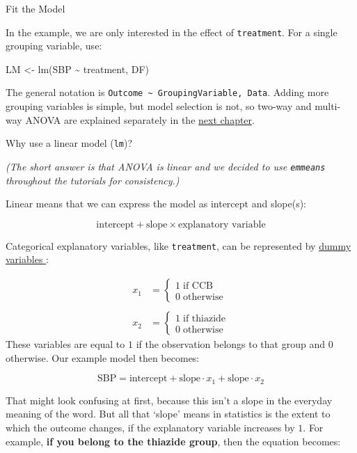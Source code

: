 \documentclass[
]{book}
\newenvironment{Shaded}{\begin{snugshade}}{\end{snugshade}}
\newcommand{\FunctionTok}[1]{\textcolor[rgb]{0.00,0.00,0.00}{#1}}
\newcommand{\NormalTok}[1]{#1}
\newcommand{\OtherTok}[1]{\textcolor[rgb]{0.56,0.35,0.01}{#1}}
\newcommand{\SpecialCharTok}[1]{\textcolor[rgb]{0.00,0.00,0.00}{#1}}
\begin{document}
Fit the Model

In the example, we are only interested in the effect of \texttt{treatment}. For a single grouping variable, use:

\begin{Shaded}
\begin{Highlighting}[]
\NormalTok{LM }\OtherTok{\textless{}{-}} \FunctionTok{lm}\NormalTok{(SBP }\SpecialCharTok{\textasciitilde{}}\NormalTok{ treatment, DF)}
\end{Highlighting}
\end{Shaded}

The general notation is \texttt{Outcome\ \textasciitilde{}\ GroupingVariable,\ Data}. Adding more grouping variables is simple, but model selection is not, so two-way and multi-way ANOVA are explained separately in the \protect\hyperlink{twowaymultiway}{next chapter}.

Why use a linear model (\texttt{lm})?

\emph{(The short answer is that ANOVA is linear and we decided to use \texttt{emmeans} throughout the tutorials for consistency.)}

Linear means that we can express the model as intercept and slope(s):

\[\text{intercept} + \text{slope} \times \text{explanatory variable}\]

Categorical explanatory variables, like \texttt{treatment}, can be represented by \href{https://youtu.be/3ZY9OSXmOrU?t=657}{dummy variables }:

\[
\begin{aligned}
  x_1 &= 
    \begin{cases}
      1 \; \text{if CCB} \\
      0 \; \text{otherwise}
    \end{cases} \\ \\
  x_2 &= 
    \begin{cases}
      1 \; \text{if thiazide} \\
      0 \; \text{otherwise}
    \end{cases}
\end{aligned}
\]
These variables are equal to \(1\) if the observation belongs to that group and \(0\) otherwise. Our example model then becomes:

\[\text{SBP} = \text{intercept} + \text{slope} \cdot x_1 + \text{slope} \cdot x_2\]

That might look confusing at first, because this isn't a slope in the everyday meaning of the word. But all that `slope' means in statistics is the extent to which the outcome changes, if the explanatory variable increases by \(1\). For example, \textbf{if you belong to the thiazide group}, then the equation becomes:
\end{document}
